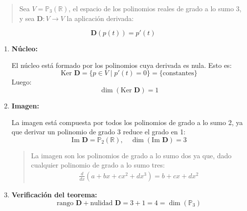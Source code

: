 
\begin{quote}
  Sea \(V = \mathbb{P}_3(\mathbb{R})\), el espacio de los polinomios reales de grado a lo sumo 3, y sea \(\mathbf{D} : V \rightarrow V\) la aplicación derivada:
\end{quote}
\[
\mathbf{D}(p(t)) = p'(t)
\]

\begin{enumerate}[label=\alph*.]
  \item \textbf{Núcleo:}

  El núcleo está formado por los polinomios cuya derivada es nula. Esto es:
  \[
  \text{Ker } \mathbf{D} = \{p \in V \mid p'(t) = 0\} = \{\text{constantes}\}
  \]
  Luego:
  \[
  \dim(\text{Ker } \mathbf{D}) = 1
  \]

  \item \textbf{Imagen:}

  La imagen está compuesta por todos los polinomios de grado a lo sumo 2, ya que derivar un polinomio de grado 3 reduce el grado en 1:
  \[
  \text{Im } \mathbf{D} = \mathbb{P}_2(\mathbb{R}), \quad \dim(\text{Im } \mathbf{D}) = 3
  \]

  \begin{quote}
    \begin{tcolorbox}[remember, title=Aclaración de la Imagen]
      La imagen son los polinomios de grado a lo sumo dos ya que, dado cualquier polinomio de grado a lo sumo tres:
      \begin{align*}
        \frac{d}{dx}\left(a+bx+cx^2+dx^3\right) = b+cx+dx^2
      \end{align*}
    \end{tcolorbox}
  \end{quote}

  \item \textbf{Verificación del teorema:}
  \[
  \text{rango } \mathbf{D} + \text{nulidad } \mathbf{D} = 3 + 1 = 4 = \dim(\mathbb{P}_3)
  \]
\end{enumerate}